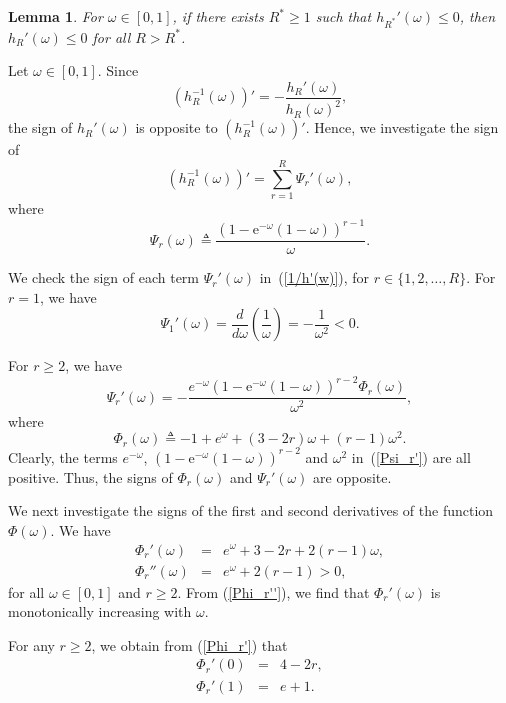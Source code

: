 \documentclass{IEEEtran}
\newtheorem{lemma}{Lemma}
\begin{document}
\begin{lemma} \label{unstable then unstable}
For $\omega \in [0,1]$, if there exists $R^* \geq 1$ such that $h_{R^*}'(\omega) \leq 0$, then $h_R'(\omega) \leq 0$ for all $R>R^*$.
\end{lemma}
\begin{IEEEproof}
Let $\omega \in [0,1]$.
Since
\begin{equation}\label{h^-1}
\left(h_R^{-1}(\omega)\right)' = - \frac{h_R'(\omega)}{h_R(\omega)^2},
\end{equation}
the sign of $h_R'(\omega)$ is opposite to $\left(h_R^{-1}(\omega)\right)'$. Hence, we investigate the sign of
\begin{equation} \label{1/h'(w)}
\left(h_R^{-1}(\omega)\right)' = \sum_{r=1}^{R}\Psi_r'(\omega),
\end{equation}
where
\begin{equation}\label{Psi_r}
\Psi_r(\omega) \triangleq \frac{\left(1 - \mathrm{e}^{-\omega}(1-\omega)\right)^{r-1}}{\omega}.
\end{equation}

We check the sign of each term $\Psi_r'(\omega)$ in~(\ref{1/h'(w)}), for $r \in \{1, 2, \ldots, R\}$.
For $r=1$, we have
\[\Psi_1'(\omega)=\frac{d}{d \omega}\left(\frac{1}{\omega}\right)=-\frac{1}{\omega^2}<0.\]

For $r\geq2$, we have
\begin{equation}\label{Psi_r'} \Psi_r'(\omega) =-\frac{e^{-\omega} \left(1 - \mathrm{e}^{-\omega}(1-\omega)\right)^{r-2}\Phi_r(\omega)}{\omega^2},
\end{equation}
where \[\Phi_r(\omega) \triangleq -1+e^\omega+(3-2r)\omega+(r-1)\omega^2.\] Clearly, the terms $e^{-\omega}$, $\left(1 -
\mathrm{e}^{-\omega}(1-\omega)\right)^{r-2}$ and $\omega^2$ in~(\ref{Psi_r'}) are all positive. Thus, the signs of $\Phi_r(\omega)$ and
$\Psi_r'(\omega)$ are opposite.

We next investigate the signs of the first and second derivatives of the function $\Phi(\omega)$. We have
\begin{eqnarray}
\Phi_r'(\omega) &  = &  e^\omega+3-2r+2(r-1)\omega, \label{Phi_r'}\\
\Phi_r''(\omega)&  =  & e^\omega+2(r-1)>0, \label{Phi_r''}
\end{eqnarray}
for all $\omega \in [0,1]$ and $r \geq 2$.
From (\ref{Phi_r''}), we find that $\Phi_r'(\omega)$ is monotonically increasing with $\omega$.

For any $r\geq2$, we obtain from (\ref{Phi_r'}) that
\begin{eqnarray}
\Phi_r'(0) & = & 4-2r, \\
\Phi_r'(1) & = & e+1.
\end{eqnarray}


\end{IEEEproof}
\end{document}
